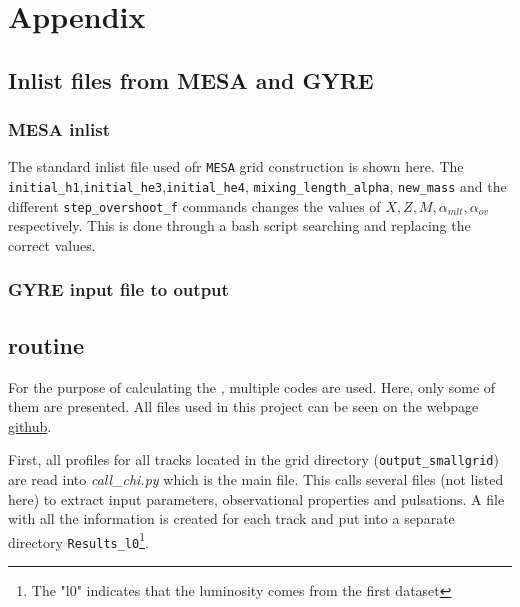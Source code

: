 \chapter*{Appendix}
\section{Inlist files from MESA and GYRE}
\label{inlist}

\subsection{MESA inlist}

The standard inlist file used ofr \texttt{MESA} grid construction is shown here. The \texttt{initial\_h1},\texttt{initial\_he3},\texttt{initial\_he4}, \texttt{mixing\_length\_alpha}, \texttt{new\_mass} and the different \texttt{step\_overshoot\_f} commands changes the values of $X,Z,M,\alpha_{mlt},\alpha_{ov}$ respectively. This is done through a bash script searching and replacing the correct values. 



\subsection{GYRE input file to output}



\section{\chis routine}
\label{chisroutine}

For the purpose of calculating the \chis, multiple codes are used. Here, only some of them are presented. All files used in this project can be seen on the webpage \url{github}. 

First, all profiles for all tracks located in the grid directory (\texttt{output\_smallgrid}) are read into \textit{call\_chi.py} which is the main file. This calls several files (not listed here) to extract input parameters, observational properties and pulsations.  A file with all the information is created for each track and put into a separate directory \texttt{Results\_l0}\footnote{The "l0" indicates that the luminosity comes from the first dataset}. 



